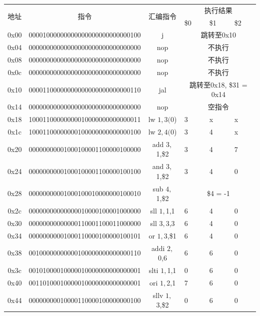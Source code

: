 \documentclass[UTF8]{ctexart}
\begin{document}
\begin{longtable}[c]{|c|c|c|p{1.5cm}<{\centering}|p{1.5cm}<{\centering}|p{1.5cm}<{\centering}|}
    \hline
    \multirow{2}{*}{地址} & \multirow{2}{*}{指令} & \multirow{2}{*}{汇编指令} & \multicolumn{3}{c|}{执行结果} \\ \cline{4-6} 
     &  &  &  \$0  &  \$1 & \$2 \\ \hline
    \endfirsthead
    \endhead
    0x00 & 00001000000000000000000000000100 & j & \multicolumn{3}{c|}{跳转至0x10} \\ \hline
    0x04 & 00000000000000000000000000000000 & nop & \multicolumn{3}{c|}{不执行} \\ \hline
    0x08 & 00000000000000000000000000000000 & nop & \multicolumn{3}{c|}{不执行} \\ \hline
    0x0c & 00000000000000000000000000000000 & nop & \multicolumn{3}{c|}{不执行} \\ \hline
    0x10 & 00001100000000000000000000000110 & jal & \multicolumn{3}{c|}{跳转至0x18, \$31 = 0x14} \\ \hline
    0x14 & 00000000000000000000000000000000 & nop & \multicolumn{3}{c|}{空指令} \\ \hline
    0x18 & 10001100000000010000000000000011 & lw $1,3($0) & 3 & x & x \\ \hline
    0x1c & 10001100000000100000000000000100 & lw $2,4($0) & 3 & 4 & x \\ \hline
    0x20 & 00000000001000100001100000100000 & add $3,$1,\$2 & 3 & 4 & 7 \\ \hline
    0x24 & 00000000001000100001100000100100 & and $3,$1,\$2 & 3 & 4 & 0 \\ \hline
    0x28 & 00000000001000100010000000100010 & sub $4,$1,\$2 & \multicolumn{3}{c|}{\$4 = -1} \\ \hline
    0x2c & 00000000000000010000100001000000 & sll $1,$1,1 & 6 & 4 & 0 \\ \hline
    0x30 & 00000000000000110001100011000000 & sll $3,$3,3 & 6 & 4 & 0 \\ \hline
    0x34 & 00000000001000110000100000100101 & or $1,$3,\$1 & 6 & 4 & 0 \\ \hline
    0x38 & 00100000000000100000000000000110 & addi $2,$0,6 & 6 & 6 & 0 \\ \hline
    0x3c & 00101000010000010000000000000001 & slti $1,$1,1 & 0 & 6 & 0 \\ \hline
    0x40 & 00110100010000010000000000000001 & ori $1,$2,1 & 7 & 6 & 0 \\ \hline
    0x44 & 00000000010000110000100000000100 & sllv $1,$3,\$2 & 0 & 6 & 0 \\ \hline

\end{longtable}
\end{document}
